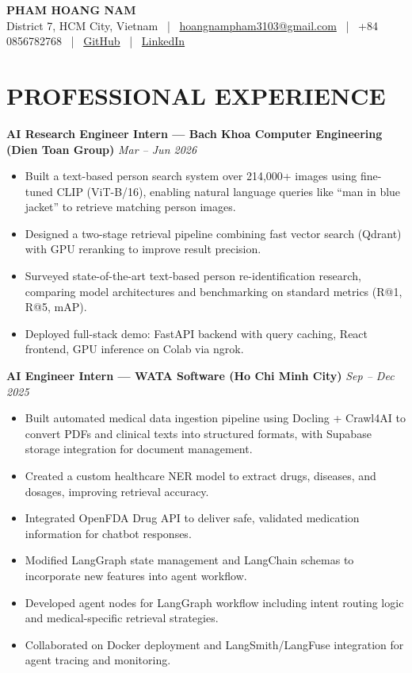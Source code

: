 \documentclass[10pt, letterpaper]{article}
\newenvironment{highlights}{
    \begin{itemize}[
        topsep=1.5pt,
        parsep=0pt,
        partopsep=0pt,
        itemsep=1.5pt,
        leftmargin=10pt
    ]
}{
    \end{itemize}
}
\let\hrefWithoutArrow\href
\renewcommand{\href}[2]{\hrefWithoutArrow{#1}{#2}}
\begin{document}
\begin{center}
\textbf{\LARGE \color{primaryColor}PHAM HOANG NAM}\\[5pt]
\small District 7, HCM City, Vietnam \ | \
\href{mailto:hoangnampham3103@gmail.com}{hoangnampham3103@gmail.com} \ | \
+84 0856782768 \ | \
\href{https://github.com/HwanNorm}{GitHub} \ | \
\href{https://www.linkedin.com/in/pham-hoang-nam-aa370b309/}{LinkedIn}
\end{center}

\vspace{4pt}

\section{PROFESSIONAL EXPERIENCE}

\textbf{AI Research Engineer Intern --- Bach Khoa Computer Engineering (Dien Toan Group)} \hfill \textit{Mar – Jun 2026}
\begin{highlights}
\item Built a text-based person search system over 214,000+ images using fine-tuned CLIP (ViT-B/16), enabling natural language queries like ``man in blue jacket'' to retrieve matching person images.
\item Designed a two-stage retrieval pipeline combining fast vector search (Qdrant) with GPU reranking to improve result precision.
\item Surveyed state-of-the-art text-based person re-identification research, comparing model architectures and benchmarking on standard metrics (R@1, R@5, mAP).
\item Deployed full-stack demo: FastAPI backend with query caching, React frontend, GPU inference on Colab via ngrok.
\end{highlights}

\vspace{6pt}

\textbf{AI Engineer Intern --- WATA Software (Ho Chi Minh City)} \hfill \textit{Sep – Dec 2025}
\begin{highlights}
\item Built automated medical data ingestion pipeline using Docling + Crawl4AI to convert PDFs and clinical texts into structured formats, with Supabase storage integration for document management.
\item Created a custom healthcare NER model to extract drugs, diseases, and dosages, improving retrieval accuracy.
\item Integrated OpenFDA Drug API to deliver safe, validated medication information for chatbot responses.
\item Modified LangGraph state management and LangChain schemas to incorporate new features into agent workflow.
\item Developed agent nodes for LangGraph workflow including intent routing logic and medical-specific retrieval strategies.
\item Collaborated on Docker deployment and LangSmith/LangFuse integration for agent tracing and monitoring.
\end{highlights}
\end{document}
